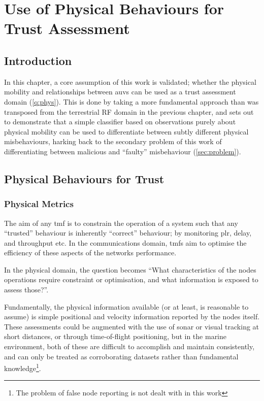 \chapter{Use of Physical Behaviours for Trust Assessment} \label{ch:physical_trust}

\section{Introduction}

In this chapter, a core assumption of this work is validated; whether the physical mobility and relationships between \glspl{auv} can be used as a trust assessment domain (\autoref{q:phys}).
This is done by taking a more fundamental approach than was transposed from the terrestrial RF domain in the previous chapter, and sets out to demonstrate that a simple classifier based on observations purely about physical mobility can be used to differentiate between subtly different physical misbehaviours, harking back to the secondary problem of this work of differentiating between malicious and ``faulty'' misbehaviour (\autoref{sec:problem}). 

\section{Physical Behaviours for Trust}\label{sec:physbev}

\subsection{Physical Metrics}
The aim of any \gls{tmf} is to constrain the operation of a system such that any ``trusted'' behaviour is inherently ``correct'' behaviour; by monitoring \gls{plr}, delay, and throughput etc. 
In the communications domain, \glspl{tmf} aim to optimise the efficiency of these aspects of the networks performance.

In the physical domain, the question becomes ``What characteristics of the nodes operations require constraint or optimisation, and what information is exposed to assess those?''.

Fundamentally, the physical information available (or at least, is reasonable to assume) is simple positional and velocity information reported by the nodes itself.
These assessments could be augmented with the use of sonar or visual tracking at short distances, or through time-of-flight positioning, but in the marine environment, both of these are difficult to accomplish and maintain consistently, and can only be treated as corroborating datasets rather than fundamental knowledge\footnote{The problem of false node reporting is not dealt with in this work}.

